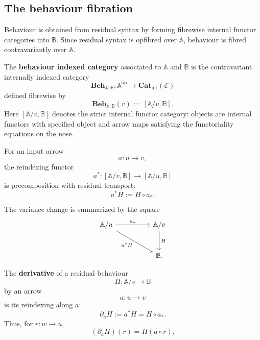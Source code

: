 \subsection{The behaviour fibration}
\label{subsec:behaviour-fibration}

Behaviour is obtained from residual syntax by forming fibrewise internal functor categories into \(\mathbb B\). Since residual syntax is opfibred over \(\mathbb A\), behaviour is fibred contravariantly over \(\mathbb A\).

\begin{definition}
\label{def:behaviour-indexed-category}
    The \textbf{behaviour indexed category} associated to \(\mathbb A\) and \(\mathbb B\) is the contravariant internally indexed category
    \[
        \mathbf{Beh}_{\mathbb A,\mathbb B}
        :
        \mathbb A^{\mathrm{op}}\to
        \mathbf{Cat}_{\mathrm{int}}(\mathcal E)
    \]
    defined fibrewise by
    \[
        \mathbf{Beh}_{\mathbb A,\mathbb B}(v)
        :=
        [\mathbb A/v,\mathbb B].
    \]
    Here \([\mathbb A/v,\mathbb B]\) denotes the strict internal functor category: objects are internal functors with specified object and arrow maps satisfying the functoriality equations on the nose.

    For an input arrow
    \[
        a:u\to v,
    \]
    the reindexing functor
    \[
        a^*:
        [\mathbb A/v,\mathbb B]\to[\mathbb A/u,\mathbb B]
    \]
    is precomposition with residual transport:
    \[
        a^*H:=H\circ a_*.
    \]
\end{definition}

The variance change is summarized by the square
\[
    \begin{tikzcd}[column sep=huge, row sep=large]
            \mathbb A/u
                \arrow[r, "a_*"]
                \arrow[dr, "{a^*H}"']
        &
            \mathbb A/v
                \arrow[d, "H"]
        \\
        &
            \mathbb B.
    \end{tikzcd}
\]

\begin{definition}[Derivative]
\label{def:derivative-behaviour}
    The \textbf{derivative} of a residual behaviour
    \[
        H:\mathbb A/v\to\mathbb B
    \]
    by an arrow
    \[
        a:u\to v
    \]
    is its reindexing along \(a\):
    \[
        \partial_aH:=a^*H=H\circ a_*.
    \]
    Thus, for \(r:w\to u\),
    \[
        (\partial_aH)(r)=H(a\circ r).
    \]
\end{definition}

